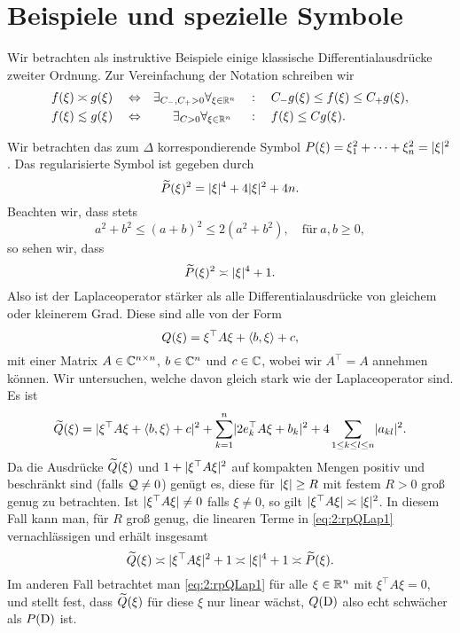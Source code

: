 \section{Beispiele und spezielle Symbole}

Wir betrachten als instruktive Beispiele
einige klassische Differentialausdrücke zweiter Ordnung.
Zur Vereinfachung der Notation schreiben wir
\begin{align}
f(\xi)\asymp g(\xi)\quad&\gdw&
\exists_{C_-,C_+>0}\forall_{\xi\in\R^n}\quad&:\quad C_-g(\xi)\leq f(\xi)\leq C_+g(\xi),\\
f(\xi)\apprle g(\xi)\quad&\gdw&
\exists_{C>0}\forall_{\xi\in\R^n}~\quad&:\quad f(\xi)\leq Cg(\xi).
\end{align}

\begin{exa}\label{exa:2:lap}
Wir betrachten das zum  $\Delta$
korrespondierende Symbol $P(\xi)=\xi_1^2+\dots+\xi_n^2=\lvert\xi\rvert^2$.
Das regularisierte Symbol ist gegeben durch
\begin{equation}
\widetilde{P}(\xi)^2=\lvert\xi\rvert^4+4\lvert\xi\rvert^2+4n.
\end{equation}
Beachten wir, dass stets
\begin{equation}\label{eq:2:sqrest}
a^2+b^2\leq(a+b)^2\leq2(a^2+b^2),\quad\text{für}~a,b\geq0,
\end{equation}
so sehen wir, dass
\begin{equation}
\widetilde{P}(\xi)^2\asymp\lvert\xi\rvert^4+1.
\end{equation}
Also ist der Laplaceoperator stärker als alle Differentialausdrücke von gleichem oder kleinerem Grad.
Diese sind alle von der Form
\begin{equation}
Q(\xi)=\xi^\top A\xi+\langle b,\xi\rangle+c,
\end{equation}
mit einer Matrix $A\in\mathbb C^{n\times n}$, $b\in\mathbb C^n$ und $c\in\mathbb C$,
wobei wir $A^\top=A$ annehmen können.
Wir untersuchen, welche davon gleich stark wie der Laplaceoperator sind.
Es ist
\begin{equation}\label{eq:2:rpQLap1}
\widetilde{Q}(\xi)=\lvert\xi^\top A\xi+\langle b,\xi\rangle+c\rvert^2+\sum_{k=1}^n\lvert2e^\top_kA\xi+b_k\rvert^2
+4\sum_{1\leq k\leq l\leq n}\lvert a_{kl}\rvert^2.
\end{equation}
Da die Ausdrücke $\widetilde{Q}(\xi)$ und $1+\lvert\xi^\top A\xi\rvert^2$
auf kompakten Mengen positiv und beschränkt sind (falls $\mathcal Q\neq0$) genügt es,
diese für $\lvert\xi\rvert\geq R$ mit festem $R>0$ groß genug zu betrachten.
Ist $\lvert\xi^\top A\xi\rvert\neq0$ falls $\xi\neq0$,
so gilt $\lvert\xi^\top A\xi\rvert\asymp\lvert\xi\rvert^2$.
In diesem Fall kann man, für $R$ groß genug,
die linearen Terme in \eqref{eq:2:rpQLap1} vernachlässigen
und erhält insgesamt
\begin{equation}
\widetilde{Q}(\xi)\asymp\lvert\xi^\top A\xi\rvert^2+1\asymp\lvert\xi\rvert^4+1\asymp\widetilde{P}(\xi).
\end{equation}
Im anderen Fall betrachtet man \eqref{eq:2:rpQLap1}
für alle $\xi\in\mathbb R^n$ mit $\xi^\top A\xi=0$,
und stellt fest, dass $\widetilde{Q}(\xi)$ für diese $\xi$ nur linear wächst,
$Q(\mathrm D)$ also echt schwächer als $P(\mathrm D)$ ist.


\end{exa}
